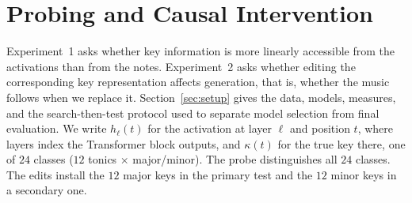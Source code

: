 \documentclass{article}
\begin{document}
\section{Probing and Causal Intervention}
\label{sec:method}
Experiment~1 asks whether key information is more linearly accessible from the activations than from the notes.
Experiment~2 asks whether editing the corresponding key representation affects generation, that is, whether the music follows when we replace it.
Section~\ref{sec:setup} gives the data, models, measures, and the search-then-test protocol used to separate model selection from final evaluation.
We write $h_\ell(t)$ for the activation at layer $\ell$ and position $t$, where layers index the Transformer block outputs, and $\kappa(t)$ for the true key there, one of $24$ classes ($12$ tonics $\times$ major/minor).
The probe distinguishes all $24$ classes.
The edits install the $12$ major keys in the primary test and the $12$ minor keys in a secondary one.
\end{document}
